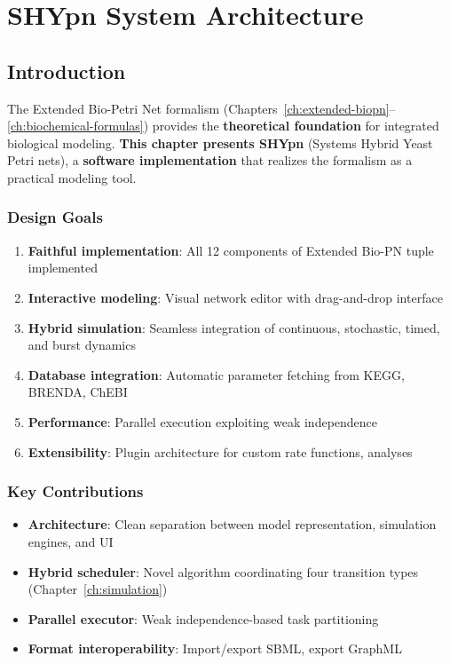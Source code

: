 \chapter{SHYpn System Architecture}
\label{ch:architecture}

\section{Introduction}
\label{sec:arch-intro}

The Extended Bio-Petri Net formalism (Chapters~\ref{ch:extended-biopn}--\ref{ch:biochemical-formulas}) provides the \textbf{theoretical foundation} for integrated biological modeling. \textbf{This chapter presents SHYpn} (Systems Hybrid Yeast Petri nets), a \textbf{software implementation} that realizes the formalism as a practical modeling tool.

\subsection{Design Goals}
\label{subsec:design-goals}

\begin{enumerate}
    \item \textbf{Faithful implementation}: All 12 components of Extended Bio-PN tuple implemented
    \item \textbf{Interactive modeling}: Visual network editor with drag-and-drop interface
    \item \textbf{Hybrid simulation}: Seamless integration of continuous, stochastic, timed, and burst dynamics
    \item \textbf{Database integration}: Automatic parameter fetching from KEGG, BRENDA, ChEBI
    \item \textbf{Performance}: Parallel execution exploiting weak independence
    \item \textbf{Extensibility}: Plugin architecture for custom rate functions, analyses
\end{enumerate}

\subsection{Key Contributions}
\label{subsec:arch-contributions}

\begin{itemize}
    \item \textbf{Architecture}: Clean separation between model representation, simulation engines, and UI
    \item \textbf{Hybrid scheduler}: Novel algorithm coordinating four transition types (Chapter~\ref{ch:simulation})
    \item \textbf{Parallel executor}: Weak independence-based task partitioning
    \item \textbf{Format interoperability}: Import/export SBML, export GraphML
\end{itemize}

